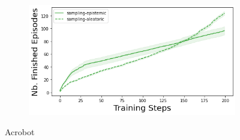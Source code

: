 \begin{figure}
\begin{subfigure}{.24\textwidth}
    \end{subfigure}
    \begin{subfigure}{.24\textwidth}
        \includegraphics[width=\textwidth]{sections/011_icml2022/resources/cartpole-n_finished_training_episodes-postnet-training-strategy.png}
    \end{subfigure}
    \vspace{-3mm}
    \caption*{Acrobot}
    \vspace{2mm}


\end{figure}
